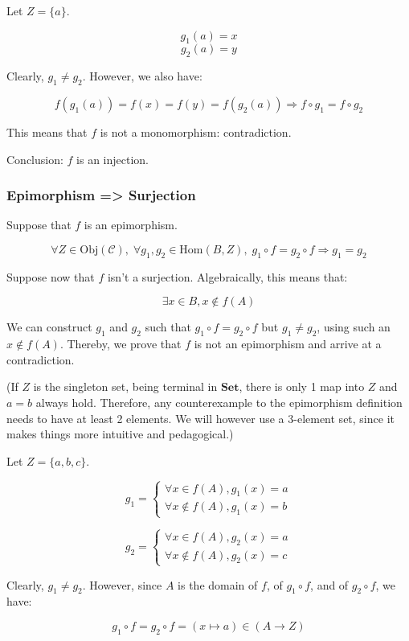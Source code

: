 \documentclass[12pt, letterpaper, twoside]{report}
\begin{document}
Let $Z = \{a\}$.

$$g_1(a) = x$$
$$g_2(a) = y$$

Clearly, $g_1 \neq g_2$. However, we also have:

$$
f(g_1(a)) = f(x) = f(y) = f(g_2(a)) \Rightarrow
f \circ g_1 = f \circ g_2
$$

This means that $f$ is not a monomorphism: contradiction.

Conclusion: $f$ is an injection.


\subsubsection*{Epimorphism => Surjection}

Suppose that $f$ is an epimorphism.

$$
\forall Z \in \text{Obj}(\mathcal{C}), \;
\forall g_1, g_2 \in \text{Hom}(B, Z), \;
g_1 \circ f = g_2 \circ f \Rightarrow g_1 = g_2
$$

Suppose now that $f$ isn't a surjection. Algebraically, this means that:

$$\exists x \in B, x \notin f(A)$$

We can construct $g_1$ and $g_2$ such that $g_1 \circ f = g_2 \circ f$ but $g_1 \neq g_2$, using such an $x \notin f(A)$. Thereby, we prove that $f$ is not an epimorphism and arrive at a contradiction.

(If $Z$ is the singleton set, being terminal in $\mathbf{Set}$, there is only 1 map into $Z$ and $a = b$ always hold. Therefore, any counterexample to the epimorphism definition needs to have at least 2 elements. We will however use a 3-element set, since it makes things more intuitive and pedagogical.)

Let $Z = \{a, b, c\}$.

$$
g_1 =
\begin{cases}
	\forall x    \in f(A), g_1(x) = a \\
	\forall x \notin f(A), g_1(x) = b
\end{cases}
$$

$$
g_2 =
\begin{cases}
	\forall x    \in f(A), g_2(x) = a \\
	\forall x \notin f(A), g_2(x) = c
\end{cases}
$$

Clearly, $g_1 \neq g_2$. However, since $A$ is the domain of $f$, of $g_1 \circ f$, and of $g_2 \circ f$, we have:

$$
g_1 \circ f = g_2 \circ f = (x \mapsto a) \in (A \to Z)
$$
\end{document}
